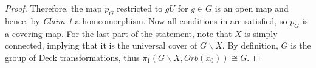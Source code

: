 \begin{proof}
{        Therefore, the map \(p_G\) restricted to \(gU\) for \(g \in G\) is an open map and hence, by \emph{Claim 1} a homeomorphism.
    }
    Now all conditions in  are satisfied, so \(p_G\) is a covering map.
    For the last part of the statement, note that \(X\) is simply connected, implying that it is the universal cover of \(G \backslash X\). %
    By definition, \(G\) is the group of Deck transformations, thus \(\pi_1(G \backslash X, Orb(x_0)) \cong G\).
\end{proof}
